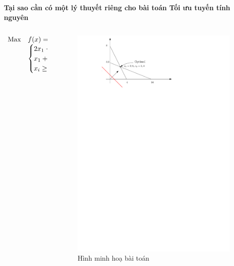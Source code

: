 \documentclass[10pt]{beamer}
\begin{document}
\begin{frame}{\bf Tại sao cần có một lý thuyết riêng cho bài toán Tối ưu tuyến tính nguyên}

\begin{columns}
    \begin{column}{0.5\textwidth}
        \begin{equation*}
        \begin{array}{lll}            
        {\rm Max}&f(x)=2x_1+2x_2\\
        & \begin{cases}
        2x_1+x_2 \leq  8 \\
        x_1+3x_2 \leq 10 \\
        x_i\geq 0,\forall i=1,2.
        \end{cases} 
        \end{array}
        \end{equation*}
    \end{column}

    \begin{column}{0.5\textwidth}
        \begin{figure}
        \centering
        \includegraphics[width=1\linewidth]{Nhom1_hinh.pdf}
        \caption{Hình minh hoạ bài toán}
        \end{figure}
    \end{column}
\end{columns}
\end{frame}
\end{document}

